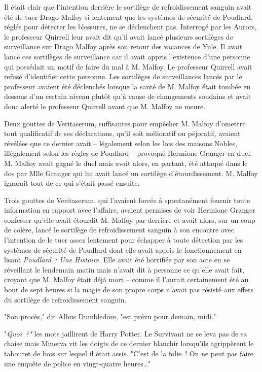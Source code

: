 Il était clair que l'intention derrière le sortilège de refroidissement sanguin avait été de tuer Drago Malfoy si lentement que les systèmes de sécurité de Poudlard, réglés pour détecter les blessures, ne se déclenchent pas. Interrogé par les Aurors, le professeur Quirrell leur avait dit qu'il avait lancé plusieurs sortilèges de surveillance sur Drago Malfoy après son retour des vacances de Yule. Il avait lancé ces sortilèges de surveillance car il avait appris l'existence d'une personne qui possédait un motif de faire du mal à M. Malfoy. Le professeur Quirrell avait refusé d'identifier cette personne. Les sortilèges de surveillances lancés par le professeur avaient été déclenchés lorsque la santé de M. Malfoy était tombée en dessous d'un certain niveau plutôt qu'à cause de changements soudains et avait donc alerté le professeur Quirrell avant que M. Malfoy ne meure.

Deux gouttes de Veritaserum, suffisantes pour empêcher M. Malfoy d'omettre tout qualificatif de ses déclarations, qu'il soit mélioratif ou péjoratif, avaient révélées que ce dernier avait -- légalement selon les lois des maisons Nobles, illégalement selon les règles de Poudlard -- provoqué Hermione Granger en duel. M. Malfoy avait gagné le duel mais avait alors, en partant, été attaqué dans le dos par Mlle Granger qui lui avait lancé un sortilège d'étourdissement. M. Malfoy ignorait tout de ce qui s'était passé ensuite.

Trois gouttes de Veritaserum, qui l'avaient forcée à spontanément fournir toute information en rapport avec l'affaire, avaient permises de voir Hermione Granger confesser qu'elle avait étourdit M. Malfoy par derrière et avait alors, sur un coup de colère, lancé le sortilège de refroidissement sanguin à son encontre avec l'intention de le tuer assez lentement pour échapper à toute détection par les systèmes de sécurité de Poudlard dont elle avait appris le fonctionnement en lisant \emph{Poudlard~: Une Histoire}. Elle avait été horrifiée par son acte en se réveillant le lendemain matin mais n'avait dit à personne ce qu'elle avait fait, croyant que M. Malfoy était déjà mort -- comme il l'aurait certainement été au bout de sept heures si la magie de son propre corps n'avait pas résisté aux effets du sortilège de refroidissement sanguin.

"Son procès," dit Albus Dumbledore, "est prévu pour demain, midi."

"\emph{Quoi~?"} les mots jaillirent de Harry Potter. Le Survivant ne se leva pas de sa chaise mais Minerva vit les doigts de ce dernier blanchir lorsqu'ils agrippèrent le tabouret de bois sur lequel il était assis. "C'est de la folie~! On ne peut pas faire une enquête de police en vingt-quatre heures…"

